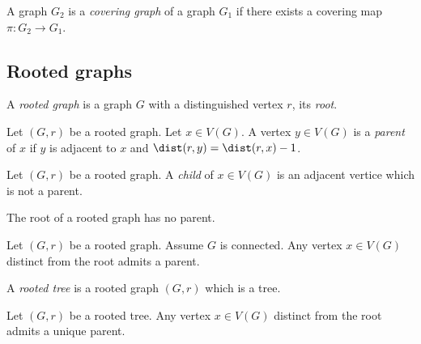 \begin{definition}
  \label{def:covering_graph}
  A graph $G_2$ is a \emph{covering graph} of a graph $G_1$ if there exists
  a covering map $\pi : G_2 \rightarrow G_1$.
\end{definition}

\subsection{Rooted graphs}

\begin{definition}
  \label{def:rooted_graph}
  A \emph{rooted graph} is a graph $G$ with a distinguished vertex $r$, its \emph{root}.
\end{definition}

\begin{definition}
  \label{def:rooted_graph_parent}
  Let $(G,r)$ be a rooted graph.
  Let $x \in V(G)$.
  A vertex $y \in V(G)$ is a \emph{parent} of $x$ if $y$ is adjacent to $x$ and $\dist(r,y) = \dist(r,x)-1$.
\end{definition}


\begin{definition}
  \label{def:rooted_graph_child}
  Let $(G,r)$ be a rooted graph.
  A \emph{child} of $x \in V(G)$ is an adjacent vertice which is not a parent.
\end{definition}

\begin{lemma}
  \label{lem:root_no_parent}
  The root of a rooted graph has no parent.
\end{lemma}

\begin{lemma}
  \label{lem:exists_parent}
  Let $(G,r)$ be a rooted graph. Assume $G$ is connected.
  Any vertex $x \in V(G)$ distinct from the root admits a parent.
\end{lemma}

\begin{definition}
  \label{def:rooted_tree}
  A \emph{rooted tree} is a rooted graph $(G,r)$ which is a tree.
\end{definition}

\begin{proposition}
  \label{prop:rooted_tree_unique_parent}
  Let $(G,r)$ be a rooted tree.
  Any vertex $x \in V(G)$ distinct from the root admits a unique parent.
\end{proposition}



